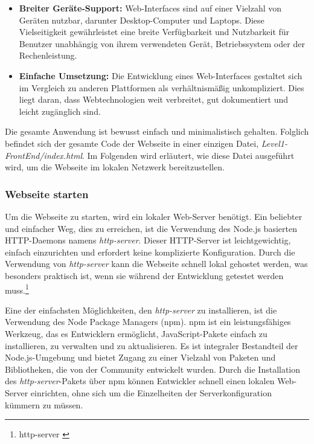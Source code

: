\begin{itemize}
    \item \textbf{Breiter Geräte-Support:} Web-Interfaces sind auf einer Vielzahl von Geräten nutzbar, darunter Desktop-Computer und Laptops. Diese Vielseitigkeit gewährleistet eine breite Verfügbarkeit und Nutzbarkeit für Benutzer unabhängig von ihrem verwendeten Gerät, Betriebssystem oder der Rechenleistung.

    \item \textbf{Einfache Umsetzung:} Die Entwicklung eines Web-Interfaces gestaltet sich im Vergleich zu anderen Plattformen als verhältnismäßig unkompliziert. Dies liegt daran, dass Webtechnologien weit verbreitet, gut dokumentiert und leicht zugänglich sind.
\end{itemize}

Die gesamte Anwendung ist bewusst einfach und minimalistisch gehalten. Folglich befindet sich der gesamte Code der Webseite in einer einzigen Datei, \textit{Level1-FrontEnd/index.html}. Im Folgenden wird erläutert, wie diese Datei ausgeführt wird, um die Webseite im lokalen Netzwerk bereitzustellen.

\subsubsection{Webseite starten}

Um die Webseite zu starten, wird ein lokaler Web-Server benötigt. Ein beliebter und einfacher Weg, dies zu erreichen, ist die Verwendung des Node.js basierten HTTP-Daemons namens \textit{http-server}. Dieser HTTP-Server ist leichtgewichtig, einfach einzurichten und erfordert keine komplizierte Konfiguration. Durch die Verwendung von \textit{http-server} kann die Webseite schnell lokal gehostet werden, was besonders praktisch ist, wenn sie während der Entwicklung getestet werden muss.\footnote{http-server \cite{http-server}}

Eine der einfachsten Möglichkeiten, den \textit{http-server} zu installieren, ist die Verwendung des Node Package Managers (npm). npm ist ein leistungsfähiges Werkzeug, das es Entwicklern ermöglicht, JavaScript-Pakete einfach zu installieren, zu verwalten und zu aktualisieren. Es ist integraler Bestandteil der Node.js-Umgebung und bietet Zugang zu einer Vielzahl von Paketen und Bibliotheken, die von der Community entwickelt wurden. Durch die Installation des \textit{http-server}-Pakets über npm können Entwickler schnell einen lokalen Web-Server einrichten, ohne sich um die Einzelheiten der Serverkonfiguration kümmern zu müssen.

